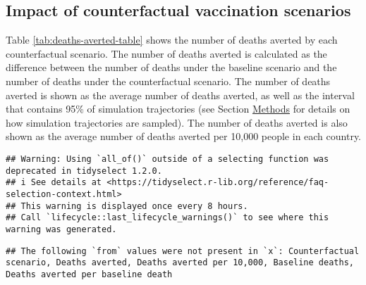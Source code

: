 \documentclass{article}
\begin{document}
\hypertarget{impact-of-counterfactual-vaccination-scenarios}{%
\subsection{Impact of counterfactual vaccination scenarios}\label{impact-of-counterfactual-vaccination-scenarios}}

Table \ref{tab:deaths-averted-table} shows the number of deaths averted by each counterfactual scenario. The number of deaths averted is calculated as the difference between the number of deaths under the baseline scenario and the number of deaths under the counterfactual scenario. The number of deaths averted is shown as the average number of deaths averted, as well as the interval that contains 95\% of simulation trajectories (see Section \protect\hyperlink{methods}{Methods} for details on how simulation trajectories are sampled). The number of deaths averted is also shown as the average number of deaths averted per 10,000 people in each country.

\begin{verbatim}
## Warning: Using `all_of()` outside of a selecting function was deprecated in tidyselect 1.2.0.
## i See details at <https://tidyselect.r-lib.org/reference/faq-selection-context.html>
## This warning is displayed once every 8 hours.
## Call `lifecycle::last_lifecycle_warnings()` to see where this warning was generated.
\end{verbatim}

\begin{verbatim}
## The following `from` values were not present in `x`: Counterfactual scenario, Deaths averted, Deaths averted per 10,000, Baseline deaths, Deaths averted per baseline death
\end{verbatim}
\end{document}
